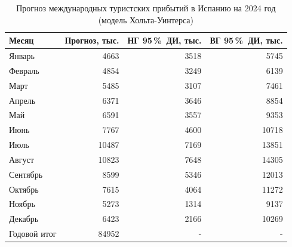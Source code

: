 \begin{table}[h!]
\centering
\caption{Прогноз международных туристских прибытий в Испанию на 2024 год (модель Хольта-Уинтерса)}
\label{tab:forecast}
{\small
\begin{tabular}{lrrr}
\toprule
Месяц & Прогноз, тыс. & НГ 95\,\%~ДИ, тыс. & ВГ 95\,\%~ДИ, тыс. \\
\midrule
Январь & 4663 & 3518 & 5745 \\
Февраль & 4854 & 3249 & 6139 \\
Март & 5485 & 3107 & 7461 \\
Апрель & 6371 & 3646 & 8854 \\
Май & 6591 & 3557 & 9353 \\
Июнь & 7767 & 4600 & 10718 \\
Июль & 10487 & 7169 & 13851 \\
Август & 10823 & 7648 & 14305 \\
Сентябрь & 8599 & 5346 & 12013 \\
Октябрь & 7615 & 4064 & 11272 \\
Ноябрь & 5273 & 1314 & 9137 \\
Декабрь & 6423 & 2166 & 10269 \\
\midrule
Годовой итог & 84952 & - & - \\
\bottomrule
\end{tabular}}
\end{table}
